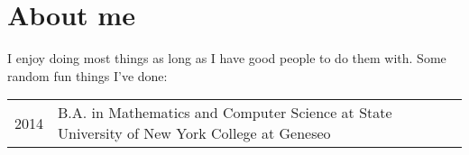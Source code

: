\documentclass[a4paper,10pt]{article}
\begin{document}
\section{About me}
I enjoy doing most things as long as I have good people to do them with. Some random fun things I've done:
\begin{tabular}{rl}	
  \textsc{2014} & B.A. in Mathematics and Computer Science at State University of New York College at Geneseo \\
\end{tabular}
\end{document}
